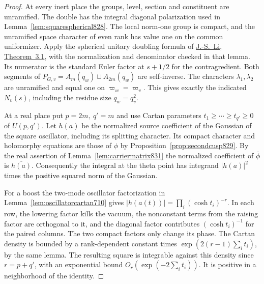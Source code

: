 \documentclass[a4paper,11pt]{article}
\theoremstyle{definition}
\theoremstyle{remark}
\numberwithin{equation}{section}
\begin{document}
\begin{proof}
At every inert place the groups, level, section and constituent
are unramified. The double has the integral diagonal
polarization used in Lemma~\ref{lem:squarespherical828}.
The local norm-one group is compact, and the unramified
space character of even rank has value one on the common
uniformizer. Apply the spherical unitary doubling formula of
\href{https://doi.org/10.1515/crll.1992.428.177}{J.-S.~Li,
Theorem~3.1}, with the normalization and denominator checked
in that lemma. Its numerator is the standard Euler factor at
\(s+1/2\) for the contragredient. Both segments of
\(P_{G,v}=A_m(q_w)\sqcup A_{2m}(q_w)\) are self-inverse.
The characters \(\lambda_1,\lambda_2\) are unramified and
equal one on \(\varpi_w=\varpi_v\). This gives exactly the
indicated \(N_v(s)\), including the residue size \(q_w=q_v^2\).

At a real place put \(p=2m,\ q'=m\) and use Cartan parameters
\(t_1\ge\cdots\ge t_{q'}\ge0\) of \(U(p,q')\). Let \(h(a)\)
be the normalized source coefficient of the Gaussian of
the square oscillator, including its splitting character.
Its compact character and holomorphy equations are those of
\(\phi\) by Proposition~\ref{prop:secondcusp829}. By the real
assertion of Lemma~\ref{lem:carriermatrix831} the normalized
coefficient of \(\bar\phi\) is \(\overline{h(a)}\).
Consequently the integral at the theta point has integrand
\(|h(a)|^2\) times the positive squared norm of the Gaussian.

For a boost the two-mode oscillator factorization in
Lemma~\ref{lem:oscillatorcartan710} gives
\(\lvert h(a(t))\rvert=\prod_i(\cosh t_i)^{-r}\).
In each row, the lowering factor kills the vacuum, the
nonconstant terms from the raising factor are orthogonal to
it, and the diagonal factor contributes \((\cosh t_i)^{-1}\)
for the paired columns. The two compact factors only change
its phase. The Cartan density is bounded by a rank-dependent
constant times \(\exp(2(r-1)\sum_i t_i)\), by the same lemma.
The resulting square is integrable against this density since
\(r=p+q'\), with an exponential bound
\(O_r(\exp(-2\sum_i t_i))\). It is positive in a neighborhood
of the identity.


\end{proof}
\end{document}
